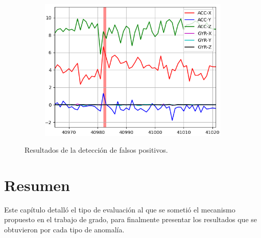 \begin{figure}[H]
{\begin{varwidth}{\textwidth}
\begin{subfigure}[h]{0.45\textwidth}
            \includegraphics[width=\textwidth]{imagenes/Cap5/fp3}
        \end{subfigure} 
        \end{varwidth}}
        \caption{Resultados de la detecci\'{o}n de falsos positivos.}
		\label{fig:resultados_falsos_positivos}
    \end{figure}

\section{Resumen}

Este cap\'{i}tulo detall\'{o} el tipo de evaluaci\'{o}n al que se someti\'{o} el mecanismo propuesto en el trabajo de grado, para finalmente presentar los resultados que se obtuvieron por cada tipo de anomal\'{i}a.
 
 